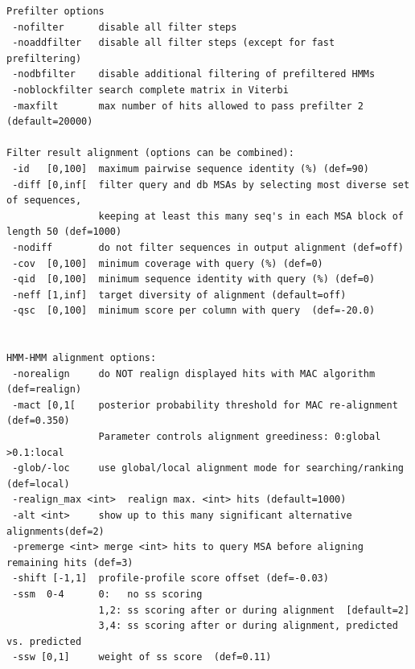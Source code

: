 \documentclass[11pt,a4paper]{article}
\begin{document}
\begin{verbatim}
Prefilter options                                                               
 -nofilter      disable all filter steps                                        
 -noaddfilter   disable all filter steps (except for fast prefiltering)         
 -nodbfilter    disable additional filtering of prefiltered HMMs                
 -noblockfilter search complete matrix in Viterbi                               
 -maxfilt       max number of hits allowed to pass prefilter 2 (default=20000)  

Filter result alignment (options can be combined):                              
 -id   [0,100]  maximum pairwise sequence identity (%) (def=90)                
 -diff [0,inf[  filter query and db MSAs by selecting most diverse set of sequences,
                keeping at least this many seq's in each MSA block of length 50 (def=1000)
 -nodiff        do not filter sequences in output alignment (def=off)           
 -cov  [0,100]  minimum coverage with query (%) (def=0)                       
 -qid  [0,100]  minimum sequence identity with query (%) (def=0)              
 -neff [1,inf]  target diversity of alignment (default=off)                     
 -qsc  [0,100]  minimum score per column with query  (def=-20.0)                 


HMM-HMM alignment options:                                                       
 -norealign     do NOT realign displayed hits with MAC algorithm (def=realign)   
 -mact [0,1[    posterior probability threshold for MAC re-alignment (def=0.350)  
                Parameter controls alignment greediness: 0:global >0.1:local     
 -glob/-loc     use global/local alignment mode for searching/ranking (def=local)
 -realign_max <int>  realign max. <int> hits (default=1000)                        
 -alt <int>     show up to this many significant alternative alignments(def=2)  
 -premerge <int> merge <int> hits to query MSA before aligning remaining hits (def=3)
 -shift [-1,1]  profile-profile score offset (def=-0.03)                         
 -ssm  0-4      0:   no ss scoring                                               
                1,2: ss scoring after or during alignment  [default=2]         
                3,4: ss scoring after or during alignment, predicted vs. predicted
 -ssw [0,1]     weight of ss score  (def=0.11)                                  


\end{verbatim}
\end{document}
